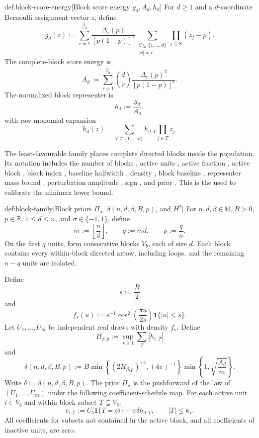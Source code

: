 \begin{definitionv}{def:block-score-energy}[Block score energy \(g_d,A_d,h_d\)]
For \(d\ge 1\) and a \(d\)-coordinate Bernoulli assignment vector \(z\), define
\[
g_d(z)
:=
\sum_{r=1}^{\bar\beta_d}
\frac{\Delta_r(p)}{[p(1-p)]^r}
\sum_{\substack{S\subseteq\{1,\ldots,d\}\\ |S|=r}}
\prod_{j\in S}(z_j-p).
\]
The complete-block score energy is
\[
A_d
:=
\sum_{r=1}^{\bar\beta_d}
\binom{d}{r}
\frac{\Delta_r(p)^2}{[p(1-p)]^r}.
\]
The normalized block representer is
\[
h_d:=\frac{g_d}{A_d},
\]
with raw-monomial expansion
\[
h_d(z)=
\sum_{T\subseteq\{1,\ldots,d\}}
h_{d,T}\prod_{j\in T}z_j .
\]
\end{definitionv}

The least-favourable family places complete directed blocks inside the population. Its notation includes the number of blocks , active units , active fraction , active block , block index , baseline halfwidth , density , block baseline , representer mass bound , perturbation amplitude , sign , and prior . This is the  used to calibrate the minimax lower bound.

\begin{definitionv}{def:block-family}[Block priors \(\Pi_\sigma\), \(\delta(n,d,\beta,B,p)\), and \(H^2\)]
For \(n,d,\beta\in\mathbb N\), \(B>0\), \(p\in\mathbb R\), \(1\le d\le n\), and \(\sigma\in\{-1,1\}\), define
\[
m:=\left\lfloor \frac nd\right\rfloor,
\qquad
q:=md,
\qquad
\rho:=\frac qn .
\]
On the first \(q\) units, form consecutive blocks \(V_b\), each of size \(d\). Each block contains every within-block directed arrow, including loops, and the remaining \(n-q\) units are isolated.

Define
\[
s:=\frac B2
\]
and
\[
f_s(u):=
s^{-1}\cos^2\left(\frac{\pi u}{2s}\right)\mathbf 1\{|u|\le s\}.
\]
Let \(U_1,\ldots,U_m\) be independent real draws with density \(f_s\). Define
\[
H_{\beta,p}:=
\sup_{r\ge 1}\sum_T |h_{r,T}|
\]
and
\[
\delta(n,d,\beta,B,p)
:=
B\min\left\{(2H_{\beta,p})^{-1},(4\pi)^{-1}\right\}
\min\left\{1,\sqrt{\frac{A_d}{m}}\right\}.
\]
Write \(\delta:=\delta(n,d,\beta,B,p)\). The prior \(\Pi_\sigma\) is the pushforward of the law of \((U_1,\ldots,U_m)\) under the following coefficient-schedule map. For each active unit \(i\in V_b\) and within-block subset \(T\subseteq V_b\),
\[
c_{i,T}
:=
U_b\mathbf 1\{T=\varnothing\}
+\sigma\delta h_{d,T},
\qquad |T|\le k_\star .
\]
All coefficients for subsets not contained in the active block, and all coefficients of inactive units, are zero.
\end{definitionv}

